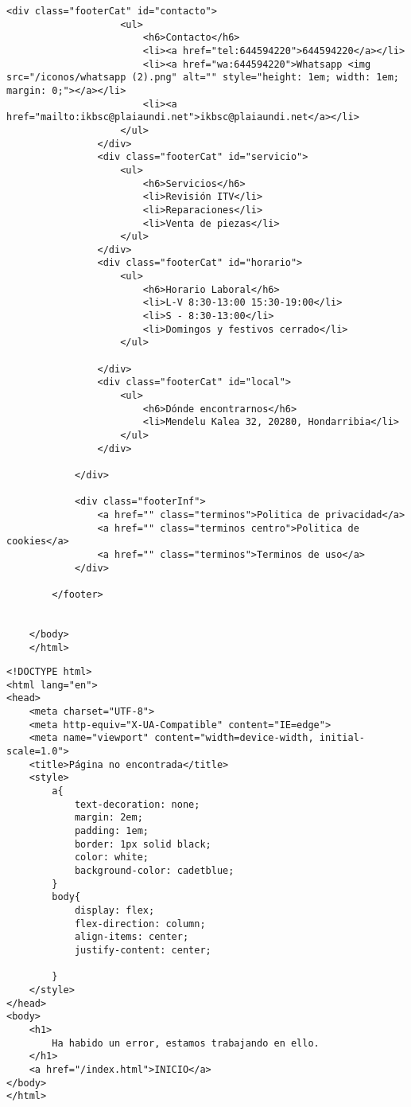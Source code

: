 \begin{lstlisting}[caption=PaginaProducto.html (LMSI)]
                <div class="footerCat" id="contacto">
                    <ul>
                        <h6>Contacto</h6>
                        <li><a href="tel:644594220">644594220</a></li>
                        <li><a href="wa:644594220">Whatsapp <img src="/iconos/whatsapp (2).png" alt="" style="height: 1em; width: 1em; margin: 0;"></a></li>
                        <li><a href="mailto:ikbsc@plaiaundi.net">ikbsc@plaiaundi.net</a></li>
                    </ul>
                </div>
                <div class="footerCat" id="servicio">
                    <ul>
                        <h6>Servicios</h6>
                        <li>Revisión ITV</li>
                        <li>Reparaciones</li>
                        <li>Venta de piezas</li>
                    </ul>
                </div>
                <div class="footerCat" id="horario">
                    <ul>
                        <h6>Horario Laboral</h6>
                        <li>L-V 8:30-13:00 15:30-19:00</li>
                        <li>S - 8:30-13:00</li>
                        <li>Domingos y festivos cerrado</li>
                    </ul>
    
                </div>
                <div class="footerCat" id="local">
                    <ul>
                        <h6>Dónde encontrarnos</h6>
                        <li>Mendelu Kalea 32, 20280, Hondarribia</li>
                    </ul>
                </div>
    
            </div>
    
            <div class="footerInf">
                <a href="" class="terminos">Politica de privacidad</a>
                <a href="" class="terminos centro">Politica de cookies</a>
                <a href="" class="terminos">Terminos de uso</a>
            </div>
    
        </footer>
        
        
    </body>
    </html>
\end{lstlisting}
\clearpage
\begin{lstlisting}[caption=error.html (LMSI)]
<!DOCTYPE html>
<html lang="en">
<head>
    <meta charset="UTF-8">
    <meta http-equiv="X-UA-Compatible" content="IE=edge">
    <meta name="viewport" content="width=device-width, initial-scale=1.0">
    <title>Página no encontrada</title>
    <style>
        a{
            text-decoration: none;
            margin: 2em;
            padding: 1em;
            border: 1px solid black;
            color: white;
            background-color: cadetblue;
        }
        body{
            display: flex;
            flex-direction: column;
            align-items: center;
            justify-content: center;

        }
    </style>
</head>
<body>
    <h1>
        Ha habido un error, estamos trabajando en ello.
    </h1>
    <a href="/index.html">INICIO</a>
</body>
</html>
\end{lstlisting}
\clearpage